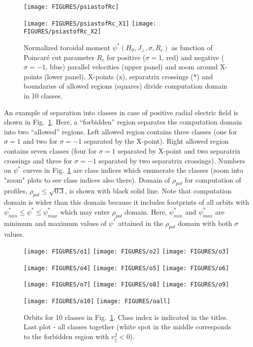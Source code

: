 \documentclass[preprint,prb,aps]{revtex4-1}
\begin{document}
\begin{figure}[ht]
\centerline{
\texttt{[image: FIGURES/psiastofRc]}
}
\centerline{
\texttt{[image: FIGURES/psiastofRc\_X1]}
\texttt{[image: FIGURES/psiastofRc\_X2]}
}
\caption[]{
Normalized toroidal moment $\psi^\ast(H_0,J_\perp,\sigma,R_c)$ as function
of Poincar\'e cut parameter $R_c$ for positive ($\sigma=1$, red) and negative
($\sigma=-1$, blue) parallel velocities (upper panel) and zoom around X-points
(lower panel). X-points (x), separatrix crossings (*) and boundaries of allowed 
regions (squares) divide computation domain in 10 classes.
}
\label{fig:psiast}
\end{figure}
An example of separation into classes in case of positive radial electric 
field is shown in Fig.~\ref{fig:psiast}. Here, a ``forbidden'' region
separates the computation domain into two ``allowed'' regions. Left allowed
region contains three classes (one for $\sigma=1$ and two for $\sigma=-1$ 
separated by the X-point). Right allowed region contains seven classes (four
for $\sigma=1$ separated by X-point and two separatrix crossings and three
for $\sigma=-1$ separated by two separatrix crossings). 
Numbers on $\psi^\ast$ curves in Fig.~\ref{fig:psiast} are class indices which
enumerate the classes (zoom into "zoom" plots to see class indices also there).
Domain of $\rho_{pol}$ 
for computation of profiles, $\rho_{pol} \le \sqrt{0.3}$, 
is shown with black solid line. Note that computation domain is wider than 
this domain because it includes footprints of all orbits with 
$\psi^\ast_{min}\le \psi^\ast\le \psi^\ast_{max}$
which may enter $\rho_{pol}$ domain. Here, $\psi^\ast_{min}$ and $\psi^\ast_{max}$
are minimum and maximum values of $\psi^\ast$ attained in the
$\rho_{pol}$ domain with both $\sigma$ values.
\begin{figure}[ht]
\centerline{
\texttt{[image: FIGURES/o1]}
\texttt{[image: FIGURES/o2]}
\texttt{[image: FIGURES/o3]}
}
\centerline{
\texttt{[image: FIGURES/o4]}
\texttt{[image: FIGURES/o5]}
\texttt{[image: FIGURES/o6]}
}
\centerline{
\texttt{[image: FIGURES/o7]}
\texttt{[image: FIGURES/o8]}
\texttt{[image: FIGURES/o9]}
}
\centerline{
\texttt{[image: FIGURES/o10]}
\texttt{[image: FIGURES/oall]}
}
\caption[]{
Orbits for 10 classes in Fig.~\ref{fig:psiast}. Class index is indicated
in the titles. Last plot - all classes together (white spot in the middle 
corresponds to the forbidden region with $v_\parallel^2<0$).
}
\label{fig:orbs}
\end{figure}
\end{document}
